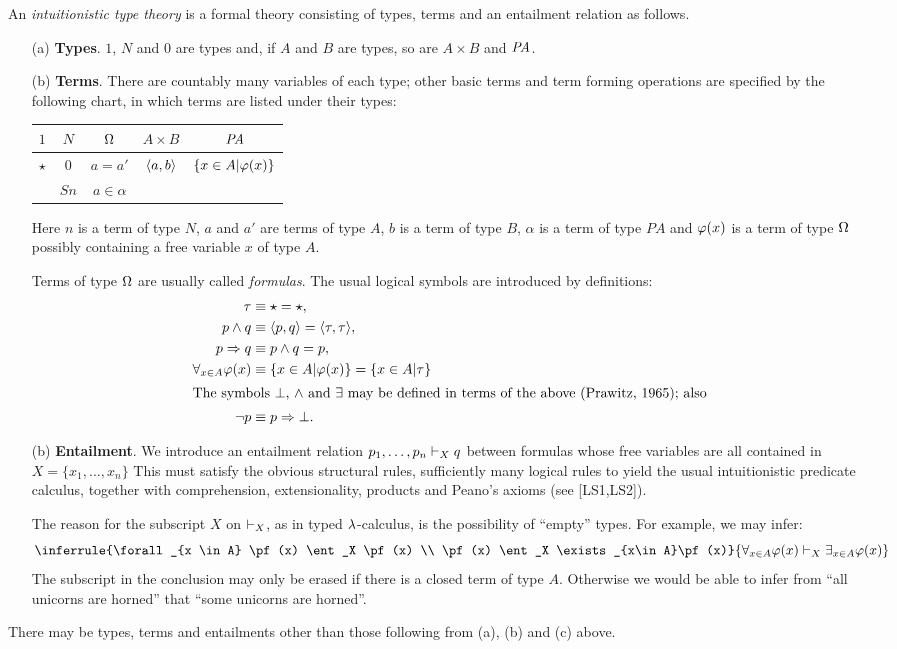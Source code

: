 \begin{defn}
An {\em intuitionistic type theory} is a formal theory consisting of
types, terms and an entailment relation as follows.
\begin{enumerate}
\item[(a)] {\bf Types}. $1$, $N$ and $0$ are types and, if $A$ and $B$ are types, so
are $A \times B$ and $\mathit{PA}$.
\item[(b)] {\bf Terms}. There are countably many variables of each type; other basic
terms and term forming operations are specified by the following chart, in
which terms are listed under their types:
\begin{center}
\begin{tabular}{ c c c c c }
$1$ & $N$ & $\Omega$ & $A \times B$ & $\mathit{PA}$\\
\hline
$\star$ & $0$ & $a = a'$ & $\langle a,b \rangle$& $\{x \in A | \varphi (x)\}$\\
&$S n$&$a \in \alpha$\\
\end{tabular}
\end{center}
\medskip
Here $n$ is a term of type $N$, $a$ and $a'$ are terms of type $A$, $b$ is a term
of type $B$, $\alpha$ is a term of type $PA$ and $\varphi(x)$ is a term of type $\Omega$
possibly containing a free variable $x$ of type $A$.

Terms of type $\Omega$ are usually called {\em formulas}. The usual logical symbols
are introduced by definitions:
\begin{align*}
\tau &\equiv \star = \star,\\
p \sland q &\equiv \la p,q \ra = \la \tau, \tau\ra,\\
p \impl q &\equiv p \sland q = p,\\
\forall_{x \in A} \pf(x) &\equiv \{ x \in A | \pf(x)\} = \{x \in A | \tau\}\\
\intertext{The symbols $\bot$, $\wedge$ and $\exists$ may be defined in terms of the above (Prawitz,
1965); also}%
\neg p &\equiv p \impl \bot .
\end{align*}
\item[(b)] {\bf Entailment}. We introduce an entailment relation $p_1, \dots, p_n \vdash_X q$
between formulas whose free variables are all contained in $X = \{x_1, \dots, x_n\}$
This must satisfy the obvious structural rules, sufficiently many logical
rules to yield the usual intuitionistic predicate calculus, together with
comprehension, extensionality, products and Peano's axioms (see [LS1,LS2]).

The reason for the subscript $X$ on $\vdash_X$, as in typed $\lambda$-calculus, is the
possibility of ``empty'' types. For example, we may infer:
\[
\inferrule
	{\forall_{x \in A} \pf(x) \ent_X \pf(x) \\ \pf(x) \ent_X \exists_{x\in A}\pf(x)}
	{\forall_{x \in A} \pf(x)  \ent_X \exists_{x\in A}\pf(x)}
\]
The subscript in the conclusion may only be erased if there is a closed term
of type $A$. Otherwise we would be able to infer from ``all unicorns are horned''
that ``some unicorns are horned''.
\end{enumerate}
\end{defn}
\noindent 
There may be types, terms and entailments other than those following from
(a), (b) and (c) above.

